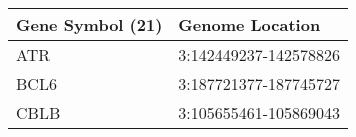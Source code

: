 \begin{tabular}{ll}
\toprule
Gene Symbol (21) &       Genome Location \\
\midrule
             ATR & 3:142449237-142578826 \\
            BCL6 & 3:187721377-187745727 \\
            CBLB & 3:105655461-105869043 \\
\bottomrule
\end{tabular}

